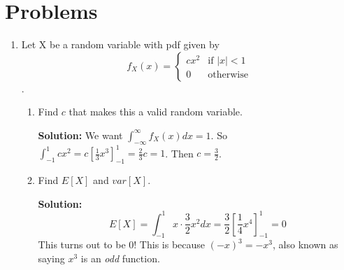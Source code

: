\documentclass{article}
\newenvironment{solution}{

            \color{blue} \smallskip \textbf{Solution:}}{}
\begin{document}
        \section{Problems}
    \begin{enumerate}
        \item Let X be a random variable with pdf given by \[
            f_X(x) = \begin{cases}
                cx^2 & \text{if } |x| < 1 \\
                0 & \text{otherwise}
            \end{cases}
        \].
        \begin{enumerate}
            \item Find $c$ that makes this a valid random variable.
            \begin{solution}
            We want $\int_{-\infty}^\infty f_X(x) dx = 1$. So $\int_{-1}^1 cx^2 = c \left[\frac{1}{3} x^3\right]^{1}_{-1} = \frac{2}{3}c = 1$. Then $c = \frac{3}{2}$.
            \end{solution}
            \item Find $E[X]$ and $var[X]$.
            \begin{solution}
            \[
                E[X] = \int_{-1}^{1} x \cdot \frac{3}{2} x^2 dx = \frac{3}{2} \left[\frac{1}{4} x^4\right]^{1}_{-1} = 0
            \]
            This turns out to be $0$! This is because $(-x)^3 = - x^3$, also known as saying $x^3$ is an \textit{odd} function.


\end{solution}
\end{enumerate}
\end{enumerate}
\end{document}

